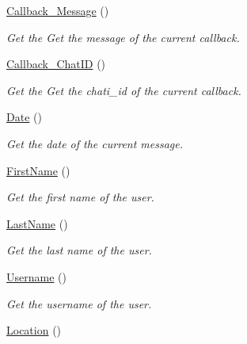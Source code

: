 \begin{DoxyCompactItemize}
\hyperlink{class_telegram_ad72a9632c75419625e9f194f400a31c9}{Callback\+\_\+\+Message} ()
\begin{DoxyCompactList}\small\item\em Get the Get the message of the current callback. \end{DoxyCompactList}\item 
\hyperlink{class_telegram_a848317ddda1c61f7173e55e0253b12e0}{Callback\+\_\+\+Chat\+I\+D} ()
\begin{DoxyCompactList}\small\item\em Get the Get the chati\+\_\+id of the current callback. \end{DoxyCompactList}\item 
\hyperlink{class_telegram_aff49fc2cda4491ff4457ca481bb8edf9}{Date} ()
\begin{DoxyCompactList}\small\item\em Get the date of the current message. \end{DoxyCompactList}\item 
\hypertarget{class_telegram_a0e3e32188dd1631ed1ed673ac844d999}{}\hyperlink{class_telegram_a0e3e32188dd1631ed1ed673ac844d999}{First\+Name} ()\label{class_telegram_a0e3e32188dd1631ed1ed673ac844d999}

\begin{DoxyCompactList}\small\item\em Get the first name of the user. \end{DoxyCompactList}\item 
\hypertarget{class_telegram_acf2c54b7fd06550cd64cf72194709a2c}{}\hyperlink{class_telegram_acf2c54b7fd06550cd64cf72194709a2c}{Last\+Name} ()\label{class_telegram_acf2c54b7fd06550cd64cf72194709a2c}

\begin{DoxyCompactList}\small\item\em Get the last name of the user. \end{DoxyCompactList}\item 
\hypertarget{class_telegram_a2521c81c6e75e23a361cc5a8a146f9c9}{}\hyperlink{class_telegram_a2521c81c6e75e23a361cc5a8a146f9c9}{Username} ()\label{class_telegram_a2521c81c6e75e23a361cc5a8a146f9c9}

\begin{DoxyCompactList}\small\item\em Get the username of the user. \end{DoxyCompactList}\item 
\hypertarget{class_telegram_aae456ae24175445c9c797b0d58d5716b}{}\hyperlink{class_telegram_aae456ae24175445c9c797b0d58d5716b}{Location} ()\label{class_telegram_aae456ae24175445c9c797b0d58d5716b}


\end{DoxyCompactItemize}
